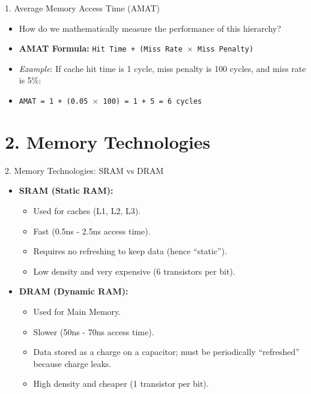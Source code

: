 \documentclass[aspectratio=169]{beamer}
\begin{document}
\begin{frame}{1. Average Memory Access Time (AMAT)}
\begin{itemize}
    \item How do we mathematically measure the performance of this hierarchy?
    \vspace{0.3cm}
    \item \textbf{AMAT Formula:} \texttt{Hit Time + (Miss Rate $\times$ Miss Penalty)}
    \vspace{0.3cm}
    \item \textit{Example}: If cache hit time is 1 cycle, miss penalty is 100 cycles, and miss rate is 5\%:
    \item \texttt{AMAT = 1 + (0.05 $\times$ 100) = 1 + 5 = 6 cycles}
\end{itemize}
\end{frame}

\section{2. Memory Technologies}

\begin{frame}{2. Memory Technologies: SRAM vs DRAM}
\begin{itemize}
    \item \textbf{SRAM (Static RAM):}
    \begin{itemize}
        \item Used for caches (L1, L2, L3).
        \item Fast (0.5ns - 2.5ns access time).
        \item Requires no refreshing to keep data (hence ``static'').
        \item Low density and very expensive (6 transistors per bit).
    \end{itemize}
    \vspace{0.3cm}
    \item \textbf{DRAM (Dynamic RAM):}
    \begin{itemize}
        \item Used for Main Memory.
        \item Slower (50ns - 70ns access time).
        \item Data stored as a charge on a capacitor; must be periodically ``refreshed'' because charge leaks.
        \item High density and cheaper (1 transistor per bit).
    \end{itemize}
\end{itemize}
\end{frame}
\end{document}
